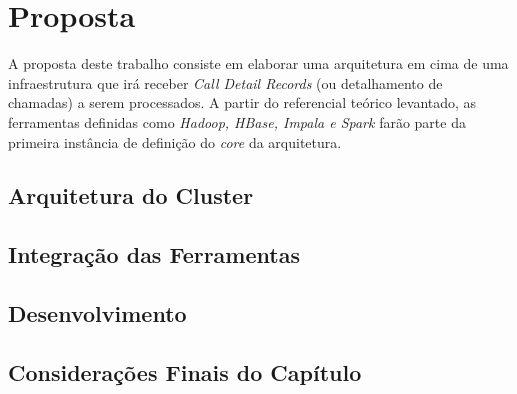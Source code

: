 \chapter[Proposta]{Proposta}

    A proposta deste trabalho consiste em elaborar uma arquitetura em cima de uma infraestrutura
    que irá receber \textit{Call Detail Records} (ou detalhamento de chamadas) a serem
    processados. A partir do referencial teórico levantado, as ferramentas definidas como
    \textit{Hadoop, HBase, Impala e Spark} farão parte da primeira instância de definição do
    \textit{core} da arquitetura.

    \section{Arquitetura do Cluster}

    \section{Integração das Ferramentas}

    \section{Desenvolvimento}

    \section{Considerações Finais do Capítulo}